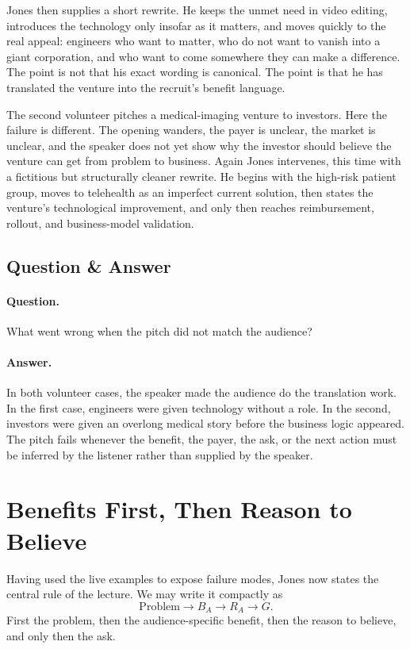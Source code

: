 Jones then supplies a short rewrite. He keeps the unmet need in video editing, introduces the technology only insofar as it matters, and moves quickly to the real appeal: engineers who want to matter, who do not want to vanish into a giant corporation, and who want to come somewhere they can make a difference. The point is not that his exact wording is canonical. The point is that he has translated the venture into the recruit's benefit language.

The second volunteer pitches a medical-imaging venture to investors. Here the failure is different. The opening wanders, the payer is unclear, the market is unclear, and the speaker does not yet show why the investor should believe the venture can get from problem to business. Again Jones intervenes, this time with a fictitious but structurally cleaner rewrite. He begins with the high-risk patient group, moves to telehealth as an imperfect current solution, then states the venture's technological improvement, and only then reaches reimbursement, rollout, and business-model validation.

\subsection{Question \& Answer}

\paragraph{Question.} What went wrong when the pitch did not match the audience?

\paragraph{Answer.} In both volunteer cases, the speaker made the audience do the translation work. In the first case, engineers were given technology without a role. In the second, investors were given an overlong medical story before the business logic appeared. The pitch fails whenever the benefit, the payer, the ask, or the next action must be inferred by the listener rather than supplied by the speaker.

\section{Benefits First, Then Reason to Believe}

Having used the live examples to expose failure modes, Jones now states the central rule of the lecture. We may write it compactly as
\begin{equation}
\text{Problem} \longrightarrow B_A \longrightarrow R_A \longrightarrow G.
\end{equation}
First the problem, then the audience-specific benefit, then the reason to believe, and only then the ask.

